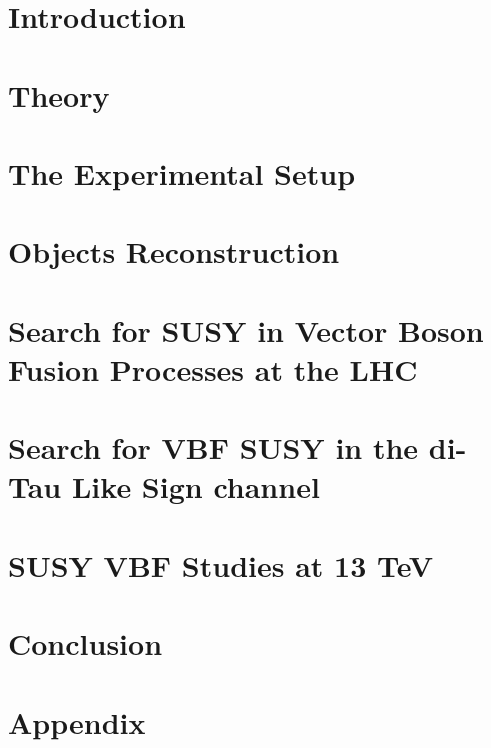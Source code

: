 \documentclass[
twoside=false,
headsepline,     %
headings=normal,
open=any,
numbers=noenddot, %
numbering %
]{scrreprt} %
\begin{document}
\setcounter{page}{1}
\tableofcontents

\cleardoublepage

\setcounter{page}{1}


\chapter{Introduction}
\label{sec:introduction}

\cleardoublepage

\chapter{Theory}
\label{sec:theory}

\cleardoublepage

\chapter{The Experimental Setup}
\label{sec:detector}

\cleardoublepage

\chapter{Objects Reconstruction}
\label{sec:obj_reco}

\cleardoublepage

\chapter{Search for SUSY in Vector Boson Fusion Processes at the LHC}
\label{sec:VBFSUSY}

\cleardoublepage

\chapter{Search for VBF SUSY in the di-Tau Like Sign channel}
\label{sec:analysis}

\cleardoublepage

\chapter{SUSY VBF Studies at 13 TeV}
\label{sec:13TeVanalysis}

\cleardoublepage

\chapter{Conclusion}
\label{sec:conclusion}

\cleardoublepage

\chapter{Appendix}
\label{sec:appendix}












\cleardoublepage
{}
{}


\end{document}
